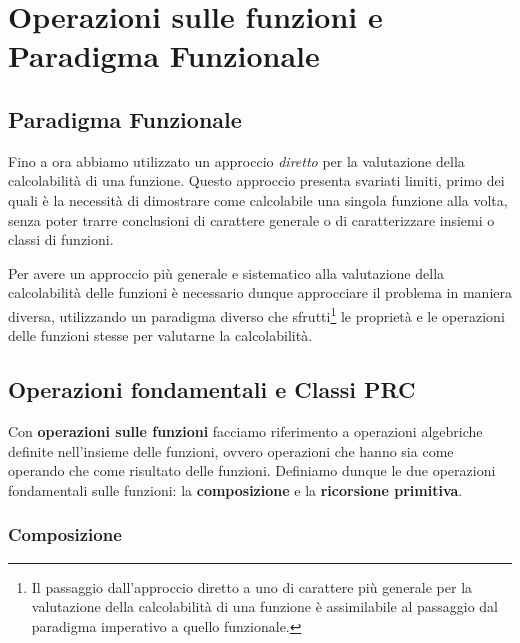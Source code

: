 \chapter{Operazioni sulle funzioni e Paradigma Funzionale}
\section{Paradigma Funzionale}
Fino a ora abbiamo utilizzato un approccio \textit{diretto} per la valutazione della calcolabilità di una funzione. Questo approccio presenta
svariati limiti, primo dei quali è la necessità di dimostrare come calcolabile una singola funzione alla volta, senza poter
trarre conclusioni  di carattere generale o di caratterizzare insiemi o classi di funzioni.

Per avere un approccio più generale e sistematico alla valutazione della calcolabilità delle funzioni è necessario dunque
approcciare il problema in maniera diversa, utilizzando un paradigma diverso che sfrutti\footnote{Il passaggio dall'approccio diretto a uno di carattere più generale per la valutazione della calcolabilità di una funzione è assimilabile al passaggio dal paradigma imperativo a quello funzionale.}
le proprietà e le operazioni delle funzioni stesse per valutarne la calcolabilità.

\section{Operazioni fondamentali e Classi PRC}

Con \textbf{operazioni sulle funzioni} facciamo riferimento a operazioni algebriche definite nell'insieme delle funzioni, ovvero operazioni che hanno sia come operando che come risultato delle funzioni.
Definiamo dunque le due operazioni fondamentali sulle funzioni: la \textbf{composizione} e la \textbf{ricorsione primitiva}.

\subsection{Composizione}


